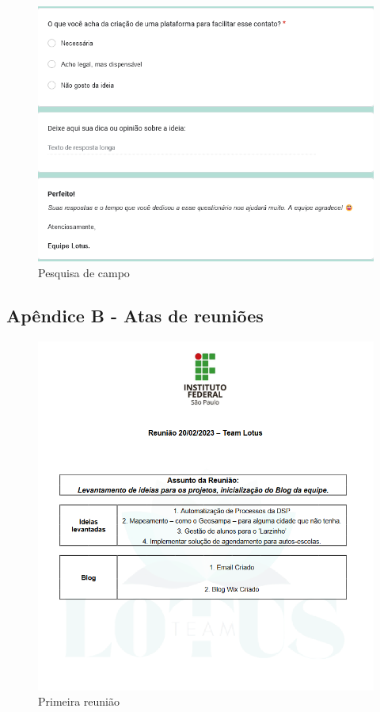 \documentclass[12pt,a4paper]{article}
\begin{document}
\begin{figure}[H]
    \centering
     \includegraphics[width=15cm]{foto4.png}
     \caption{Pesquisa de campo}
     \label{fig06}
\end{figure}

\subsection{Apêndice B  - Atas de reuniões}
\begin{figure}[H]
    \centering
     \includegraphics[width=15cm]{ilus1.png}
     \caption{Primeira reunião}
     \label{fig07}
\end{figure}
\end{document}

